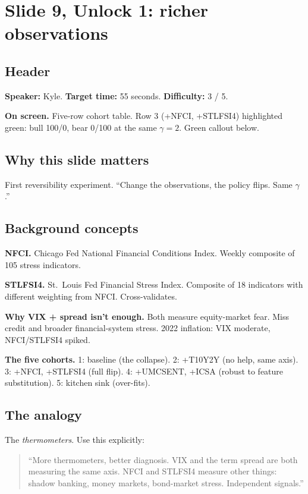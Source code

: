 \documentclass[11pt]{article}
\begin{document}
\section*{Slide 9, Unlock 1: richer observations}

\subsection*{Header}

\textbf{Speaker:} Kyle. \quad\textbf{Target time:} 55 seconds. \quad\textbf{Difficulty:} 3 / 5.

\textbf{On screen.} Five-row cohort table. Row 3 (+NFCI, +STLFSI4) highlighted green: bull 100/0, bear 0/100 at the same $\gamma = 2$. Green callout below.

\subsection*{Why this slide matters}

First reversibility experiment. ``Change the observations, the policy flips. Same $\gamma$.''

\subsection*{Background concepts}

\textbf{NFCI.} Chicago Fed National Financial Conditions Index. Weekly composite of 105 stress indicators.

\textbf{STLFSI4.} St.\ Louis Fed Financial Stress Index. Composite of 18 indicators with different weighting from NFCI. Cross-validates.

\textbf{Why VIX + spread isn't enough.} Both measure equity-market fear. Miss credit and broader financial-system stress. 2022 inflation: VIX moderate, NFCI/STLFSI4 spiked.

\textbf{The five cohorts.} 1: baseline (the collapse). 2: +T10Y2Y (no help, same axis). 3: +NFCI, +STLFSI4 (full flip). 4: +UMCSENT, +ICSA (robust to feature substitution). 5: kitchen sink (over-fits).

\subsection*{The analogy}

The \emph{thermometers}. Use this explicitly:

\begin{quote}
``More thermometers, better diagnosis. VIX and the term spread are both measuring the same axis. NFCI and STLFSI4 measure other things: shadow banking, money markets, bond-market stress. Independent signals.''
\end{quote}
\end{document}

